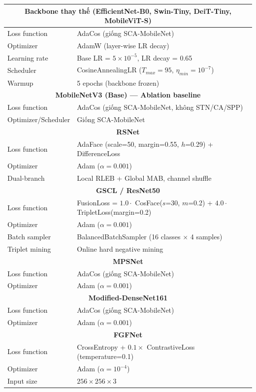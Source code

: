 \documentclass[12pt,a4paper]{article}
\begin{document}
\begin{table}[H]
\begin{center}
{\begin{tabular}{l|l}
\hline
\multicolumn{2}{|c|}{\textbf{Backbone thay thế (EfficientNet-B0, Swin-Tiny, DeiT-Tiny, MobileViT-S)}} \\
\hline
Loss function & AdaCos (giống SCA-MobileNet) \\
Optimizer & AdamW (layer-wise LR decay) \\
Learning rate & Base LR = $5 \times 10^{-5}$, LR decay = 0.65 \\
Scheduler & CosineAnnealingLR ($T_{max} = 95$, $\eta_{min} = 10^{-7}$) \\
Warmup & 5 epochs (backbone frozen) \\
\hline
\multicolumn{2}{|c|}{\textbf{MobileNetV3 (Base) --- Ablation baseline}} \\
\hline
Loss function & AdaCos (giống SCA-MobileNet, không STN/CA/SPP) \\
Optimizer/Scheduler & Giống SCA-MobileNet \\
\hline
\multicolumn{2}{|c|}{\textbf{RSNet}} \\
\hline
Loss function & AdaFace (scale=50, margin=0.55, $h$=0.29) + DifferenceLoss \\
Optimizer & Adam ($\alpha=0.001$) \\
Dual-branch & Local RLEB + Global MAB, channel shuffle \\
\hline
\multicolumn{2}{|c|}{\textbf{GSCL / ResNet50}} \\
\hline
Loss function & FusionLoss = $1.0 \cdot$ CosFace($s$=30, $m$=0.2) + $4.0 \cdot$ TripletLoss(margin=0.2) \\
Optimizer & Adam ($\alpha=0.001$) \\
Batch sampler & BalancedBatchSampler (16 classes $\times$ 4 samples) \\
Triplet mining & Online hard negative mining \\
\hline
\multicolumn{2}{|c|}{\textbf{MPSNet}} \\
\hline
Loss function & AdaCos (giống SCA-MobileNet) \\
Optimizer & Adam ($\alpha=0.001$) \\
\hline
\multicolumn{2}{|c|}{\textbf{Modified-DenseNet161}} \\
\hline
Loss function & AdaCos (giống SCA-MobileNet) \\
Optimizer & Adam ($\alpha=0.001$) \\
\hline
\multicolumn{2}{|c|}{\textbf{FGFNet}} \\
\hline
Loss function & CrossEntropy + $0.1 \times$ ContrastiveLoss (temperature=0.1) \\
Optimizer & Adam ($\alpha = 10^{-4}$) \\
Input size & $256 \times 256 \times 3$ \\
\hline
\end{tabular}%
}
\label{tab:training_config}
\end{center}
\end{table}
\end{document}
